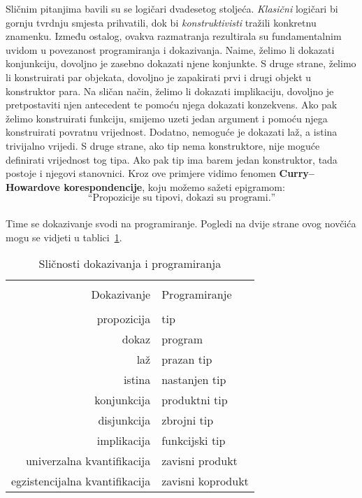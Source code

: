 Sličnim pitanjima bavili su se logičari dvadesetog stoljeća. \textit{Klasični} logičari bi gornju tvrdnju smjesta prihvatili,
dok bi \textit{konstruktivisti} tražili konkretnu znamenku.
Između ostalog, ovakva razmatranja rezultirala su fundamentalnim uvidom u povezanost programiranja i dokazivanja.
Naime, želimo li dokazati konjunkciju, dovoljno je zasebno dokazati njene konjunkte.
S druge strane, želimo li konstruirati par objekata, dovoljno je zapakirati prvi i drugi objekt u konstruktor para.
Na sličan način, želimo li dokazati implikaciju, dovoljno je pretpostaviti njen antecedent te pomoću njega dokazati konzekvens.
Ako pak želimo konstruirati funkciju, smijemo uzeti jedan argument i pomoću njega konstruirati povratnu vrijednost.
Dodatno, nemoguće je dokazati laž, a istina trivijalno vrijedi.
S druge strane, ako tip nema konstruktore, nije moguće definirati vrijednost tog tipa.
Ako pak tip ima barem jedan konstruktor, tada postoje i njegovi stanovnici.
Kroz ove primjere vidimo fenomen \textbf{Curry--Howardove korespondencije}, koju možemo sažeti epigramom:
\[
  \textrm{``Propozicije su tipovi, dokazi su programi.''}
\]
\\ Time se dokazivanje svodi na programiranje. Pogledi na dvije strane ovog novčića mogu se vidjeti u tablici~\ref{tab:curryhoward}.
\begin{table}[!hbt]
  \centering
  \begin{tabular}[!htb]{rl}
    \toprule \\
    Dokazivanje & Programiranje \\
    \midrule \\
    propozicija & tip \\
    dokaz & program \\
    laž & prazan tip \\
    istina & nastanjen tip \\    
    konjunkcija & produktni tip \\
    disjunkcija & zbrojni tip \\
    implikacija & funkcijski tip \\
    univerzalna kvantifikacija & zavisni produkt \\
    egzistencijalna kvantifikacija & zavisni koprodukt \\
    \bottomrule
  \end{tabular}
  \caption{Sličnosti dokazivanja i programiranja}\label{tab:curryhoward}
\end{table}

